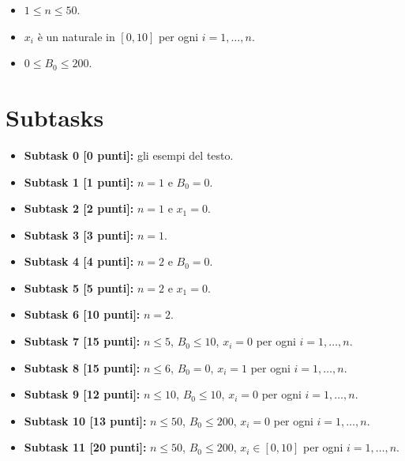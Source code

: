 




\begin{itemize}[nolistsep, noitemsep]
  \item $1 \le n \le 50$.
  \item $x_i$ è un naturale in $[0, 10]$ per ogni $i=1,\ldots, n$.
  \item $0 \le B_0 \le 200$.
\end{itemize}
  
  \section*{Subtasks}
  \begin{itemize}
    \item \textbf{Subtask 0 [0 punti]:} gli esempi del testo.
    \item \textbf{Subtask 1 [1 punti]:} $n=1$ e $B_0 = 0$.
    \item \textbf{Subtask 2 [2 punti]:} $n=1$ e $x_1 = 0$.
    \item \textbf{Subtask 3 [3 punti]:} $n=1$.
    \item \textbf{Subtask 4 [4 punti]:} $n=2$ e $B_0 = 0$.
    \item \textbf{Subtask 5 [5 punti]:} $n=2$ e $x_1 = 0$.
    \item \textbf{Subtask 6 [10 punti]:} $n=2$.
    \item \textbf{Subtask 7 [15 punti]:} $n \leq 5$, $B_0 \leq 10$, $x_i = 0$ per ogni $i=1,\ldots, n$.
    \item \textbf{Subtask 8 [15 punti]:} $n \leq 6$, $B_0 = 0$, $x_i = 1$ per ogni $i=1,\ldots, n$.
    \item \textbf{Subtask 9 [12 punti]:} $n \leq 10$, $B_0 \leq 10$, $x_i = 0$ per ogni $i=1,\ldots, n$.
    \item \textbf{Subtask 10 [13 punti]:} $n \le 50$, $B_0 \leq 200$, $x_i = 0$ per ogni $i=1,\ldots, n$.
    \item \textbf{Subtask 11 [20 punti]:} $n \le 50$, $B_0 \leq 200$, $x_i \in [0, 10]$ per ogni $i=1,\ldots, n$.
  \end{itemize}
  
